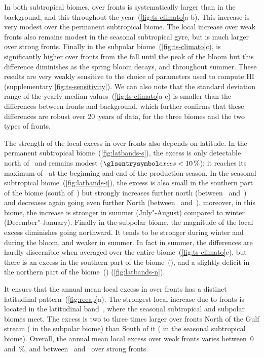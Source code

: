 In both subtropical biomes,  over fronts is systematically larger than in the background, and this throughout the year~(\cref{fig:ts-climato}a-b).
This increase is very modest over the permanent subtropical biome.
The local increase over weak fronts also remains modest in the seasonal subtropical gyre, but is much larger over strong fronts.
Finally in the subpolar biome~(\cref{fig:ts-climato}c),  is significantly higher over fronts from the fall until the peak of the bloom but this difference diminishes as the spring bloom decays, and throughout summer.
These results are very weakly sensitive to the choice of parameters used to compute HI (supplementary \cref{fig:ts-sensitivity}).
We can also note that the standard deviation range of the yearly median values~(\cref{fig:ts-climato}a-c) is smaller than the differences between fronts and background, which further confirms that these differences are robust over 20~years of data, for the three biomes and the two types of fronts.

The strength of the local excess in  over fronts also depends on latitude.
In the permanent subtropical biome~(\cref{fig:latbands-s}), the excess is only detectable north of~ and remains modest (\(\am{exces}<\pct{10}\)); it reaches its maximum of~ at the beginning and end of the production season.
In the seasonal subtropical biome~(\cref{fig:latbands-i}), the excess is also small in the southern part of the biome (south of~) but strongly increases further north (between~ and~) and decreases again going even further North (between~ and~).
moreover, in this biome, the increase is stronger in summer (July"-August) compared to winter (December"-January).
Finally in the subpolar biome, the magnitude of the local excess diminishes going northward.
It tends to be stronger during winter and during the bloom, and weaker in summer.
In fact in summer, the differences are hardly discernible when averaged over the entire biome~(\cref{fig:ts-climato}c), but there is an excess  in the southern part of the biome~(), and a slightly deficit in the northern part of the biome~() (\cref{fig:latbands-n}).

It ensues that the annual mean local excess in  over fronts has a distinct latitudinal pattern~(\cref{fig:recap}a).
The strongest local increase due to fronts is located in the latitudinal band~, where the seasonal subtropical and subpolar biomes meet.
The excess is two to three times larger over fronts North of the Gulf stream ( in the subpolar biome) than South of it ( in the seasonal subtropical biome).
Overall, the annual mean local excess over weak fronts varies between~\num{0} and~\%, and between~ and~ over strong fronts.



